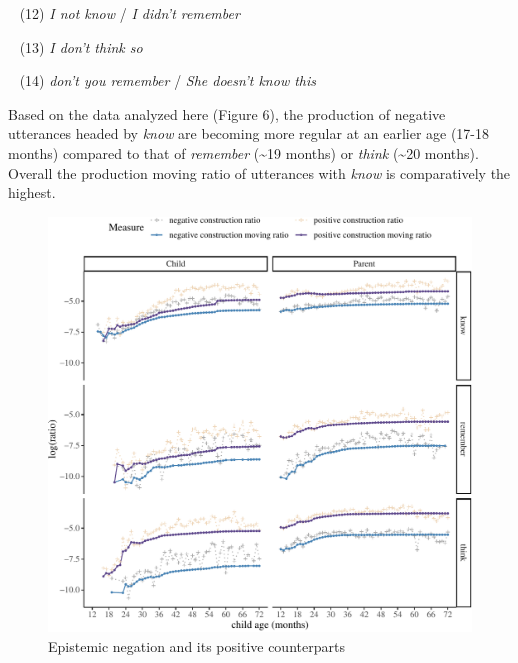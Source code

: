 \documentclass[
  english,
  man,floatsintext]{apa6}
\begin{document}
~
(12) \emph{I not know} / \emph{I didn't remember}

~
(13) \emph{I don't think so}

~
(14) \emph{don't you remember} / \emph{She doesn't know this}

Based on the data analyzed here (Figure 6), the production of negative utterances headed by \emph{know} are becoming more regular at an earlier age (17-18 months) compared to that of \emph{remember} (\textasciitilde19 months) or \emph{think} (\textasciitilde20 months). Overall the production moving ratio of utterances with \emph{know} is comparatively the highest.

\begin{figure}[H]

{\centering \includegraphics{neg_construction_article_files/figure-latex/epistemic-1} 

}

\caption{Epistemic negation and its positive counterparts}\label{fig:epistemic}
\end{figure}
\end{document}
